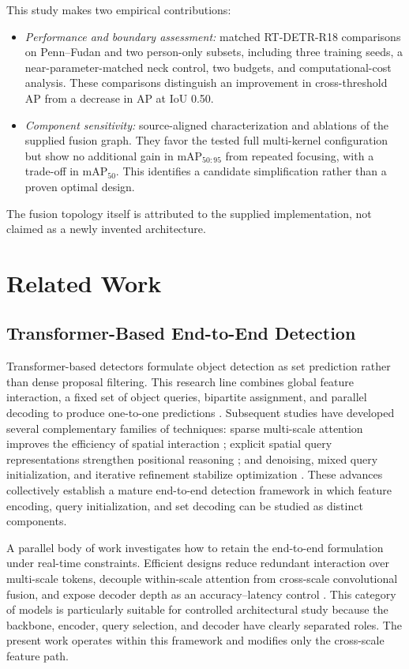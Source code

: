 \documentclass[journal]{IEEEtran}
\newcommand{\mapfifty}{mAP$_{50}$}
\newcommand{\mapcoco}{mAP$_{50:95}$}
\begin{document}
This study makes two empirical contributions:
\begin{itemize}
    \item \emph{Performance and boundary assessment:} matched RT-DETR-R18 comparisons on Penn--Fudan and two person-only subsets, including three training seeds, a near-parameter-matched neck control, two budgets, and computational-cost analysis. These comparisons distinguish an improvement in cross-threshold AP from a decrease in AP at IoU 0.50.
    \item \emph{Component sensitivity:} source-aligned characterization and ablations of the supplied fusion graph. They favor the tested full multi-kernel configuration but show no additional gain in \mapcoco{} from repeated focusing, with a trade-off in \mapfifty{}. This identifies a candidate simplification rather than a proven optimal design.
\end{itemize}
The fusion topology itself is attributed to the supplied implementation, not claimed as a newly invented architecture.

\section{Related Work}
\subsection{Transformer-Based End-to-End Detection}
Transformer-based detectors formulate object detection as set prediction rather than dense proposal filtering. This research line combines global feature interaction, a fixed set of object queries, bipartite assignment, and parallel decoding to produce one-to-one predictions \cite{carion2020detr}. Subsequent studies have developed several complementary families of techniques: sparse multi-scale attention improves the efficiency of spatial interaction \cite{zhu2021deformable}; explicit spatial query representations strengthen positional reasoning \cite{liu2022dab}; and denoising, mixed query initialization, and iterative refinement stabilize optimization \cite{zhang2023dino}. These advances collectively establish a mature end-to-end detection framework in which feature encoding, query initialization, and set decoding can be studied as distinct components.

A parallel body of work investigates how to retain the end-to-end formulation under real-time constraints. Efficient designs reduce redundant interaction over multi-scale tokens, decouple within-scale attention from cross-scale convolutional fusion, and expose decoder depth as an accuracy--latency control \cite{zhao2024rtdetr}. This category of models is particularly suitable for controlled architectural study because the backbone, encoder, query selection, and decoder have clearly separated roles. The present work operates within this framework and modifies only the cross-scale feature path.
\end{document}
